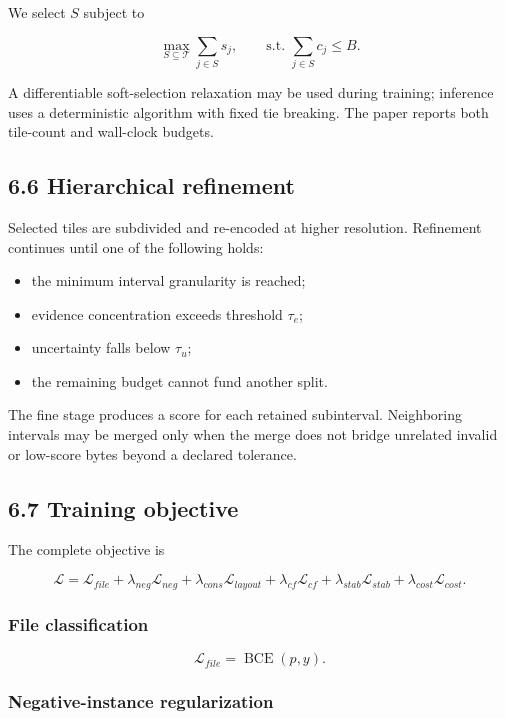 \documentclass[
  10pt,
]{article}
\providecommand{\tightlist}{%
  \setlength{\itemsep}{0pt}\setlength{\parskip}{0pt}}
\begin{document}
We select \(S\) subject to

\[
\max_{S \subseteq \mathcal{T}} \sum_{j\in S}s_j, \qquad
\text{s.t. } \sum_{j\in S}c_j \le B.
\]

A differentiable soft-selection relaxation may be used during training;
inference uses a deterministic algorithm with fixed tie breaking. The
paper reports both tile-count and wall-clock budgets.

\subsection{6.6 Hierarchical refinement}\label{hierarchical-refinement}

Selected tiles are subdivided and re-encoded at higher resolution.
Refinement continues until one of the following holds:

\begin{itemize}
\tightlist
\item
  the minimum interval granularity is reached;
\item
  evidence concentration exceeds threshold \(\tau_e\);
\item
  uncertainty falls below \(\tau_u\);
\item
  the remaining budget cannot fund another split.
\end{itemize}

The fine stage produces a score for each retained subinterval.
Neighboring intervals may be merged only when the merge does not bridge
unrelated invalid or low-score bytes beyond a declared tolerance.

\subsection{6.7 Training objective}\label{training-objective}

The complete objective is

\[
\mathcal{L} = \mathcal{L}_{file}
+ \lambda_{neg}\mathcal{L}_{neg}
+ \lambda_{cons}\mathcal{L}_{layout}
+ \lambda_{cf}\mathcal{L}_{cf}
+ \lambda_{stab}\mathcal{L}_{stab}
+ \lambda_{cost}\mathcal{L}_{cost}.
\]

\subsubsection{File classification}\label{file-classification}

\[
\mathcal{L}_{file}=\operatorname{BCE}(p,y).
\]

\subsubsection{Negative-instance
regularization}\label{negative-instance-regularization}
\end{document}
